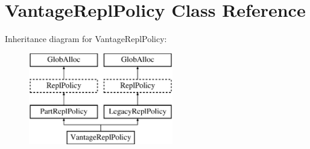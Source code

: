 \hypertarget{classVantageReplPolicy}{\section{Vantage\-Repl\-Policy Class Reference}
\label{classVantageReplPolicy}
}
Inheritance diagram for Vantage\-Repl\-Policy\-:\begin{figure}[H]
\begin{center}
\leavevmode
\includegraphics[height=4.000000cm]{classVantageReplPolicy}
\end{center}
\end{figure}
